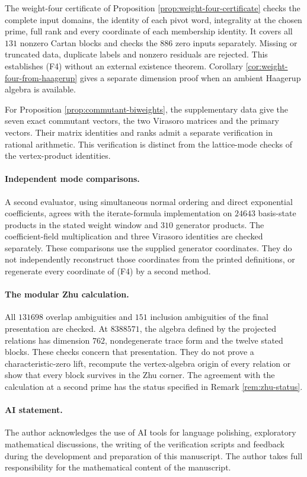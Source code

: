 \documentclass[leqno]{article}
\numberwithin{equation}{section}
\begin{document}
The weight-four certificate of Proposition \ref{prop:weight-four-certificate} checks the complete input domains, the identity of each pivot word, integrality at the chosen prime, full rank and every coordinate of each membership identity. It covers all $131$ nonzero Cartan blocks and checks the $886$ zero inputs separately. Missing or truncated data, duplicate labels and nonzero residuals are rejected. This establishes \textup{(F4)} without an external existence theorem. Corollary \ref{cor:weight-four-from-haagerup} gives a separate dimension proof when an ambient Haagerup algebra is available.

For Proposition \ref{prop:commutant-biweights}, the supplementary data give the seven exact commutant vectors, the two Virasoro matrices and the primary vectors. Their matrix identities and ranks admit a separate verification in rational arithmetic. This verification is distinct from the lattice-mode checks of the vertex-product identities.

\paragraph{Independent mode comparisons.}
A second evaluator, using simultaneous normal ordering and direct exponential coefficients, agrees with the iterate-formula implementation on $24643$ basis-state products in the stated weight window and $310$ generator products. The coefficient-field multiplication and three Virasoro identities are checked separately. These comparisons use the supplied generator coordinates. They do not independently reconstruct those coordinates from the printed definitions, or regenerate every coordinate of \textup{(F4)} by a second method.

\paragraph{The modular Zhu calculation.}
All $131698$ overlap ambiguities and $151$ inclusion ambiguities of the final presentation are checked. At $8388571$, the algebra defined by the projected relations has dimension $762$, nondegenerate trace form and the twelve stated blocks. These checks concern that presentation. They do not prove a characteristic-zero lift, recompute the vertex-algebra origin of every relation or show that every block survives in the Zhu corner. The agreement with the calculation at a second prime has the status specified in Remark \ref{rem:zhu-status}.

\paragraph{AI statement.}
The author acknowledges the use of AI tools for language polishing, exploratory mathematical discussions, the writing of the verification scripts and feedback during the development and preparation of this manuscript. The author takes full responsibility for the mathematical content of the manuscript.
\end{document}
